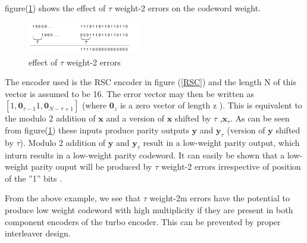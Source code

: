 \documentclass[twocolumn]{article}
\begin{document}
\paragraph{}
 figure(\ref{RSC3})  shows the effect of $\tau$ weight-2 errors on the codeword weight.
 
\begin{figure}[h!]
\centering
		\includegraphics[width=0.45\textwidth]{RSCExample.pdf}
		\caption{ effect of $\tau$ weight-2 errors}
		\label{RSC3}
		\end{figure}
	
 The encoder used is the RSC encoder in figure (\ref{RSC})
  and the length N of this vector is assumed to 
be 16. The error vector may then be written as $[1, \mathbf{0}_{\tau-1} 1, \mathbf{0}_{N-\tau+1}]$
(where $\mathbf{0}_z$ is a zero vector of length z ).
This is equivalent to the modulo 2 addition of $\mathbf{x}$ and a version of
 $\mathbf{x}$ shifted by $\tau$ ,$\mathbf{x}_{\tau}$. As can be seen from 
figure(\ref{RSC3}) these inputs produce parity outputs $\mathbf{y}$ and $\mathbf{y}_{\tau}$
(version of $\mathbf{y}$ shifted by $\tau$). Modulo 2 addition of $\mathbf{y}$ and
$\mathbf{y}_{\tau}$ result in a low-weight parity output, which inturn results
in a low-weight parity codeword. It can easily be shown that a low-weight parity ouput
will be produced by $\tau$ weight-2 errors irrespective of position of the ''1'' bits . 

 From the above example, we see that $\tau$ weight-2m errors have the potential to
produce low weight codeword with high multiplicity if they are present in both 
component encoders of the turbo encoder. This can be prevented by proper interleaver
 design.
 
\end{document}
